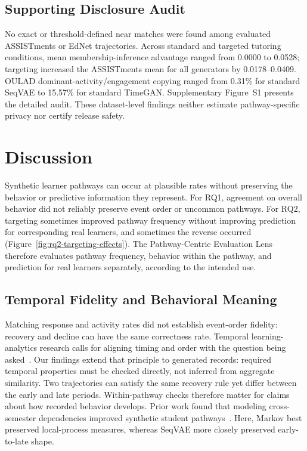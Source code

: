 \documentclass[fleqn,10pt]{JLA_article}
\begin{document}
\subsection{Supporting Disclosure Audit}
\label{sec:disclosure-results}
No exact or threshold-defined near matches were found among evaluated ASSISTments or EdNet trajectories. Across standard and targeted tutoring conditions, mean membership-inference advantage ranged from 0.0000 to 0.0528; targeting increased the ASSISTments mean for all generators by 0.0178--0.0409. OULAD dominant-activity/engagement copying ranged from 0.31\% for standard SeqVAE to 15.57\% for standard TimeGAN. Supplementary Figure~S1 presents the detailed audit. These dataset-level findings neither estimate pathway-specific privacy nor certify release safety.
\FloatBarrier

\section{Discussion}

Synthetic learner pathways can occur at plausible rates without preserving the behavior or predictive information they represent. For RQ1, agreement on overall behavior did not reliably preserve event order or uncommon pathways. For RQ2, targeting sometimes improved pathway frequency without improving prediction for corresponding real learners, and sometimes the reverse occurred (Figure~\ref{fig:rq2-targeting-effects}). The Pathway-Centric Evaluation Lens therefore evaluates pathway frequency, behavior within the pathway, and prediction for real learners separately, according to the intended use.

\subsection{Temporal Fidelity and Behavioral Meaning}
\label{sec:window-assembly}

Matching response and activity rates did not establish event-order fidelity: recovery and decline can have the same correctness rate. Temporal learning-analytics research calls for aligning timing and order with the question being asked~\cite{knight2017time,molenaar2014sequential,saint2020combining}. Our findings extend that principle to generated records: required temporal properties must be checked directly, not inferred from aggregate similarity. Two trajectories can satisfy the same recovery rule yet differ between the early and late periods. Within-pathway checks therefore matter for claims about how recorded behavior develops. Prior work found that modeling cross-semester dependencies improved synthetic student pathways~\cite{huang2026pathways}. Here, Markov best preserved local-process measures, whereas SeqVAE more closely preserved early-to-late shape.
\end{document}
